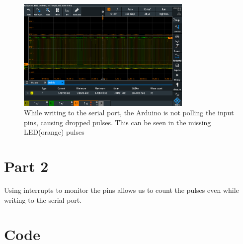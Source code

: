 \documentclass{article}
\begin{document}
\begin{figure}[h]
    \centering
    \includegraphics[width=0.75\textwidth]{Project1RotaryEncoder/oscilloscope_missing_pulses.PNG}
    \caption{While writing to the serial port, the Arduino is not polling the input pins, causing dropped pulses. This can be seen in the missing LED(orange) pulses}
    \label{fig:oscdrop}
\end{figure}


\section*{Part 2}
Using interrupts to monitor the pins allows us to count the pulses even while writing to the serial port.


\appendix
\section{Code}\label{appendix:code}






\end{document}
